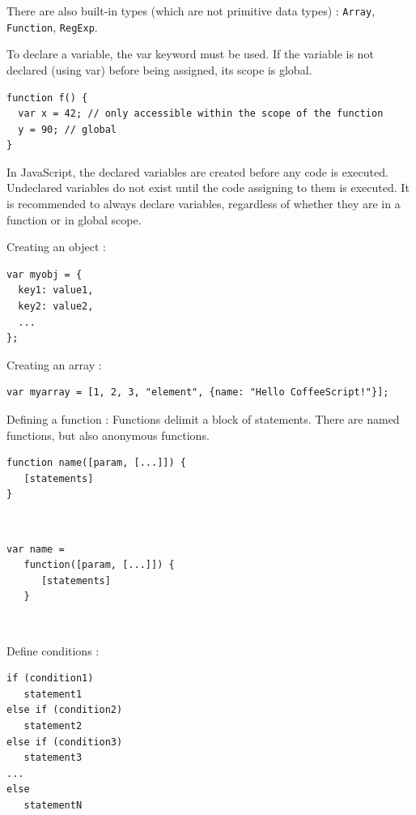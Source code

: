 \documentclass[a4paper,10pt]{article}
\begin{document}
There are also built-in types (which are not primitive data types) : \lstinline|Array|, \lstinline|Function|, \lstinline|RegExp|.

To declare a variable, the var keyword must be used.
If the variable is not declared (using var) before being assigned, its scope is global.

\begin{lstlisting}
function f() {
  var x = 42; // only accessible within the scope of the function
  y = 90; // global
}
\end{lstlisting}

In JavaScript, the declared variables are created before any code is executed. Undeclared variables do not exist until the code assigning to them is executed.
It is recommended to always declare variables, regardless of whether they are in a function or in global scope.

Creating an object :
\begin{lstlisting}
var myobj = {
  key1: value1,
  key2: value2,
  ...
};
\end{lstlisting}


Creating an array :
\begin{lstlisting}
var myarray = [1, 2, 3, "element", {name: "Hello CoffeeScript!"}];
\end{lstlisting}

Defining a function :
Functions delimit a block of statements.
There are named functions, but also anonymous functions.


\begin{minipage}[c]{.5\linewidth}
   \begin{lstlisting}[title=Named function,captionpos=t]
function name([param, [...]]) {
   [statements]
}
  \end{lstlisting}
~\\

\end{minipage} \hfill
\begin{minipage}[c]{.5\linewidth}
   \begin{lstlisting}[title=Anonymous function,captionpos=t]
var name = 
   function([param, [...]]) {
      [statements]
   }
\end{lstlisting}
~\\

\end{minipage}


Define conditions :

\begin{lstlisting}
if (condition1)
   statement1
else if (condition2)
   statement2
else if (condition3)
   statement3
...
else
   statementN
\end{lstlisting}
\end{document}
